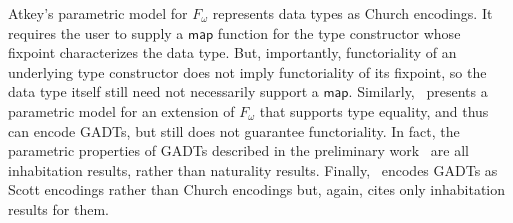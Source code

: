 \documentclass[acmsmall,screen,review,anonymous]{acmart}
\theoremstyle{definition}
\begin{document}
\begin{comment}
On the other hand, despite there
being no models interpreting type constructors as functors for calculi
incorporating GADTs as Church encodings,
parametric models for such calculi do exist, and these can be used,
e.g., to determine which instances of a GADT are inhabited.
\end{comment}

Atkey's parametric model for $F_\omega$ represents data types as
Church encodings. It requires the user to supply a $\mathsf{map}$
function for the type constructor whose fixpoint characterizes the
data type. But, importantly, functoriality of an underlying type
constructor does not imply functoriality of its fixpoint, so the data
type itself still need not necessarily support a
$\mathsf{map}$. Similarly,~\cite{vw10} presents a parametric model for
an extension of $F_\omega$ that supports type equality, and thus can
encode GADTs, but still does not guarantee functoriality. In fact,
the parametric properties of GADTs described in the preliminary
work~\cite{vw06} are all inhabitation results, rather than naturality
results. Finally,~\cite{ms09} encodes GADTs as Scott encodings rather
than Church encodings but, again, cites only inhabitation results for
them.


\end{document}
